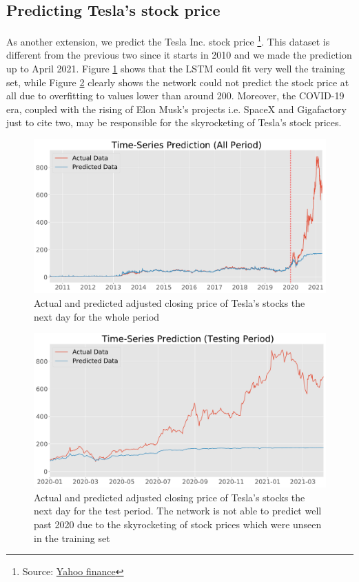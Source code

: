 \documentclass[12pt]{article}
\begin{document}
\subsection{Predicting Tesla's stock price}
As another extension, we predict the Tesla Inc. stock price \footnote{Source: \href{https://finance.yahoo.com/quote/TSLA/}{Yahoo finance}}. 
This dataset is different from the previous two since it starts in 2010 and we made the prediction up to April 2021.
Figure \ref{fig:all_tesla} shows that the LSTM could fit very well the training set, while Figure \ref{fig:test_tesla} clearly shows the network could not predict the stock price at all due to overfitting to values lower than around 200. Moreover, the COVID-19 era, coupled with the rising of Elon Musk's projects i.e. SpaceX and Gigafactory just to cite two, may be responsible for the skyrocketing of Tesla's stock prices.
\begin{figure}
    \centering
    \includegraphics[width=\textwidth]{images/prediction_base_all_tesla.pdf}
    \caption{Actual and predicted adjusted closing price of Tesla's stocks the next day for the whole period}
    \label{fig:all_tesla}
\end{figure}
\begin{figure}
    \centering
    \includegraphics[width=\textwidth]{images/prediction_base_test_tesla.pdf}
    \caption{Actual and predicted adjusted closing price of Tesla's stocks the next day for the test period. The network is not able to predict well past 2020 due to the skyrocketing of stock prices which were unseen in the training set}
    \label{fig:test_tesla}
\end{figure}
\end{document}
